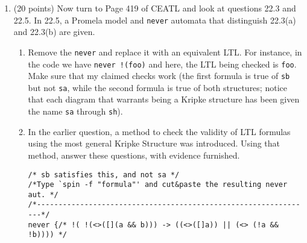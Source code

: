 \documentclass[11pt]{article}
\begin{document}
\begin{enumerate}
\newlength{\minpagw}
\settowidth{\minpagw}{\hspace{40em}}

\begin{minipage}{\minpagw}
\end{minipage}

\clearpage
  


\item (20 points) 
  Now turn to Page 419 of CEATL and look at questions 22.3 and 22.5.
  In 22.5, a Promela model and {\tt never} automata
  that distinguish 22.3(a) and 22.3(b) are given.
  \begin{enumerate}
  \item Remove the {\tt never} and replace it with an equivalent LTL.
    For instance, in the code we have {\tt never !(foo)} and here,
    the LTL being checked is {\tt foo}.
    Make sure that my claimed checks work (the first formula is true
    of {\tt sb} but not {\tt sa}, while the second formula is true
    of both structures; notice that each diagram
    that warrants being a Kripke structure has been given the name
    {\tt sa} through {\tt sh}).

  \item In the earlier question,
    a method to check the validity of LTL
    formulas using the most general Kripke Structure was introduced.
    Using that method, answer these questions, with evidence furnished.



 

\begin{verbatim}
/* sb satisfies this, and not sa */
/*Type `spin -f "formula"' and cut&paste the resulting never aut. */
/*----------------------------------------------------------------*/
never {/* !( !(<>([](a && b))) -> ((<>([]a)) || (<> (!a && !b)))) */
\end{verbatim}



\end{enumerate}
\end{enumerate}
\end{document}
